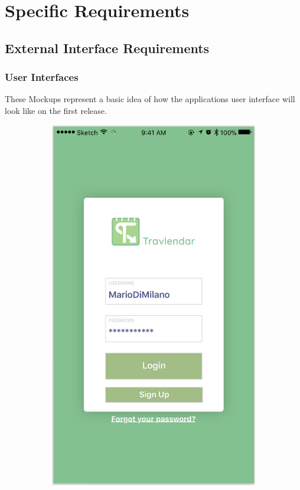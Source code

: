 \documentclass[12pt]{article}
\begin{document}
\section{Specific Requirements}

\subsection{External Interface Requirements}

\subsubsection{User Interfaces}
These Mockups represent a basic idea of how the applications user interface will look like on the first release.

\begin{figure}[H]
\centering
    \begin{subfigure}{.4\textwidth}
        \includegraphics[scale=0.47]{interfaceLogin.png}

\end{subfigure}
\end{figure}
\end{document}
